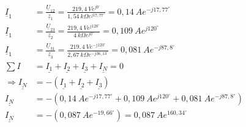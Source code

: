 \begin{enumerate}[label=\alph*)]
	\begin{align*}
		\underline{I}_{1} &= \frac{\underline{U}_{12}}{\underline{z}_{1}} = 
    \frac{219,4\ Ve^{j0^\circ}}{1,54\ k\Omega e^{j17,77^\circ}}=0,14\ Ae^{-j17,77^\circ}\\ 
    \underline{I}_{1} &= \frac{\underline{U}_{23}}{\underline{z}_{2}} = 
    \frac{219,4\ Ve^{j120^\circ}}{4\ k\Omega e^{j0^\circ}}=0,109\ Ae^{j120^\circ}\\ 
    \underline{I}_{1} &= \frac{\underline{U}_{31}}{\underline{z}_{3}} = 
    \frac{219,4\ Ve^{-j120^\circ}}{2,67\ k\Omega e^{-j36,13^\circ}}=0,081\ Ae^{-j87,8^\circ}\\
		\sum I &= \underline{I_1}+\underline{I_2}+\underline{I_3}+\underline{I_N}=0\\
		\Rightarrow \underline{I_N}&=-(\underline{I_1}+\underline{I_2}+\underline{I_3})\\
    \underline{I_N} &= -(0,14\ Ae^{-j17,77^\circ}+0,109\ Ae^{j120^\circ}+0,081\ Ae^{-j87,8^\circ})\\ 
    \underline{I_N} &= -(0,087\ Ae^{-19,66^\circ})=0,087\ Ae^{160,34^\circ}
  \end{align*}


\end{enumerate}
